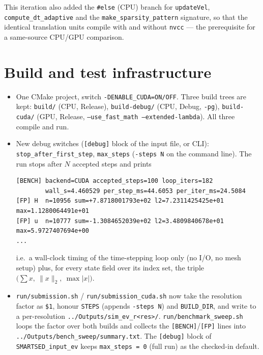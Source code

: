 \documentclass[11pt,a4paper]{article}
\begin{document}
This iteration also added the \texttt{\#else} (CPU) branch for
\texttt{updateVel}, \texttt{compute\_dt\_adaptive} and the
\texttt{make\_sparsity\_pattern} signature, so that the identical translation
units compile with and without \texttt{nvcc} --- the prerequisite for a
same-source CPU/GPU comparison.

\section{Build and test infrastructure}

\begin{itemize}\setlength\itemsep{2pt}
\item One CMake project, switch \texttt{-DENABLE\_CUDA=ON/OFF}. Three build
      trees are kept: \texttt{build/} (CPU, Release), \texttt{build-debug/}
      (CPU, Debug, \texttt{-pg}), \texttt{build-cuda/} (GPU, Release,
      \texttt{--use\_fast\_math --extended-lambda}). All three compile and run.
\item New debug switches (\texttt{[debug]} block of the input file, or CLI):
      \texttt{stop\_after\_first\_step}, \texttt{max\_steps}
      (\texttt{-steps N} on the command line). The run stops after $N$ accepted
      steps and prints
\begin{Verbatim}[fontsize=\footnotesize,xleftmargin=1em,breaklines=true,breakanywhere=true]
[BENCH] backend=CUDA accepted_steps=100 loop_iters=182
        wall_s=4.460529 per_step_ms=44.6053 per_iter_ms=24.5084
[FP] H  n=10956 sum=+7.8718001793e+02 l2=7.2311425425e+01 max=1.1280064491e+01
[FP] u  n=10777 sum=-1.3084652039e+02 l2=3.4809840678e+01 max=5.9727407694e+00
...
\end{Verbatim}
      i.e.\ a wall-clock timing of the time-stepping loop only (no I/O, no mesh
      setup) plus, for every state field over its index set, the triple
      $\bigl(\sum x,\ \lVert x\rVert_2,\ \max|x|\bigr)$.
\item \texttt{run/submission.sh} / \texttt{run/submission\_cuda.sh} now take the
      resolution factor as \texttt{\$1}, honour \texttt{STEPS} (appends
      \texttt{-steps N}) and \texttt{BUILD\_DIR}, and write to a
      per-resolution \texttt{../Outputs/sim\_ev\_r<res>/}.
      \texttt{run/benchmark\_sweep.sh} loops the factor over both builds and
      collects the \texttt{[BENCH]}/\texttt{[FP]} lines into
      \texttt{../Outputs/bench\_sweep/summary.txt}. The \texttt{[debug]}
      block of \texttt{SMARTSED\_input\_ev} keeps \texttt{max\_steps = 0}
      (full run) as the checked-in default.
\end{itemize}
\end{document}
